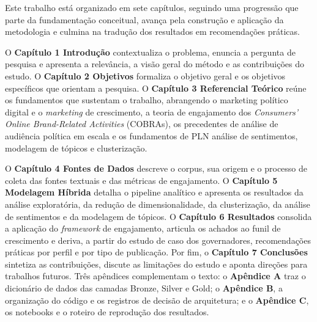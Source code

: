Este trabalho está organizado em sete capítulos, seguindo uma progressão que parte da fundamentação conceitual, avança pela construção e aplicação da metodologia e culmina na tradução dos resultados em recomendações práticas.

O \textbf{Capítulo 1 \textemdash{} Introdução} contextualiza o problema, enuncia a pergunta de pesquisa e apresenta a relevância, a visão geral do método e as contribuições do estudo. O \textbf{Capítulo 2 \textemdash{} Objetivos} formaliza o objetivo geral e os objetivos específicos que orientam a pesquisa. O \textbf{Capítulo 3 \textemdash{} Referencial Teórico} reúne os fundamentos que sustentam o trabalho, abrangendo o marketing político digital e o \emph{marketing} de crescimento, a teoria de engajamento dos \emph{Consumers' Online Brand-Related Activities} (COBRAs), os precedentes de análise de audiência política em escala e os fundamentos de PLN \textemdash{} análise de sentimentos, modelagem de tópicos e clusterização.

O \textbf{Capítulo 4 \textemdash{} Fontes de Dados} descreve o corpus, sua origem e o processo de coleta das fontes textuais e das métricas de engajamento. O \textbf{Capítulo 5 \textemdash{} Modelagem Híbrida} detalha o pipeline analítico e apresenta os resultados da análise exploratória, da redução de dimensionalidade, da clusterização, da análise de sentimentos e da modelagem de tópicos. O \textbf{Capítulo 6 \textemdash{} Resultados} consolida a aplicação do \emph{framework} de engajamento, articula os achados ao funil de crescimento e deriva, a partir do estudo de caso dos governadores, recomendações práticas por perfil e por tipo de publicação. Por fim, o \textbf{Capítulo 7 \textemdash{} Conclusões} sintetiza as contribuições, discute as limitações do estudo e aponta direções para trabalhos futuros. Três apêndices complementam o texto: o \textbf{Apêndice A} traz o dicionário de dados das camadas Bronze, Silver e Gold; o \textbf{Apêndice B}, a organização do código e os registros de decisão de arquitetura; e o \textbf{Apêndice C}, os notebooks e o roteiro de reprodução dos resultados.

